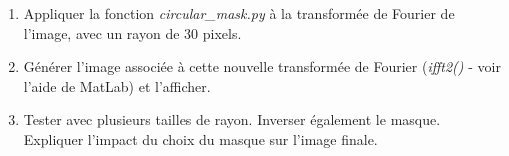 \documentclass[10pt]{article} %
\begin{document}
\begin{minipage}[t]{1.0\linewidth}
\begin{enumerate}
	\medskip
	
	\item Appliquer la fonction \textsl{circular\_mask.py} à la transformée de Fourier de l'image, avec un rayon de 30 pixels.
	\item Générer l'image associée à cette nouvelle transformée de Fourier (\textsl{ifft2()} - voir l'aide de MatLab) et l'afficher.
	\item Tester avec plusieurs tailles de rayon. Inverser également le masque. Expliquer l'impact du choix du masque sur l'image finale.
\end{enumerate}

\end{minipage}
\end{document}
